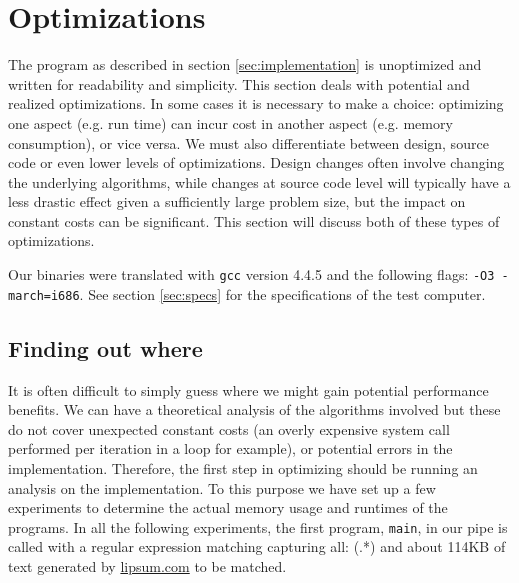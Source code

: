 \section{Optimizations}
\label{sec:optimizations}
The program as described in section \vref{sec:implementation} is
unoptimized and written for readability and simplicity. This section
deals with potential and realized optimizations. In some cases it is
necessary to make a choice: optimizing one aspect (e.g. run time) can
incur cost in another aspect (e.g. memory consumption), or vice versa.
We must also differentiate between design, source code or even lower
levels of optimizations. Design changes often involve changing the
underlying algorithms, while changes at source code level will
typically have a less drastic effect given a sufficiently large
problem size, but the impact on constant costs can be
significant. This section will discuss both of these types of
optimizations.

Our binaries were translated with \texttt{gcc} version 4.4.5 and the
following flags: \texttt{-O3 -march=i686}. See section
\vref{sec:specs} for the specifications of the test computer.

\subsection{Finding out where}
\label{sec:finding_out_where}
It is often difficult to simply guess where we might gain potential
performance benefits. We can have a theoretical analysis of the
algorithms involved but these do not cover unexpected constant costs
(an overly expensive system call performed per iteration in a loop for
example), or potential errors in the implementation.  Therefore, the
first step in optimizing should be running an analysis on the
implementation. To this purpose we have set up a few experiments to
determine the actual memory usage and runtimes of the programs. In all the
following experiments, the first program, \texttt{main}, in our pipe
is called with a regular expression matching capturing all:
\textsf{(.*)} and about 114KB of text generated by \url{lipsum.com} to
be matched.


